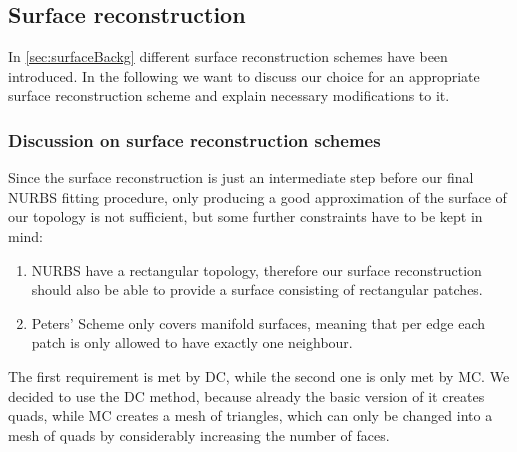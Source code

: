 \subsection{Surface reconstruction}
In \autoref{sec:surfaceBackg} different surface reconstruction schemes have been introduced. In the following we want to discuss our choice for an appropriate surface reconstruction scheme and explain necessary modifications to it.

\subsubsection{Discussion on surface reconstruction schemes}
Since the surface reconstruction is just an intermediate step before our final \ac{NURBS} fitting procedure, only producing a good approximation of the surface of our topology is not sufficient, but some further constraints have to be kept in mind:
\begin{enumerate}
\item \ac{NURBS} have a rectangular topology, therefore our surface reconstruction should also be able to provide a surface consisting of rectangular patches.
\item Peters' Scheme only covers manifold surfaces, meaning that per edge each patch is only allowed to have exactly one neighbour.
\end{enumerate}
The first requirement is met by \ac{DC}, while the second one is only met by \ac{MC}. We decided to use the \ac{DC} method, because already the basic version of it creates \acp{quad}, while \ac{MC} creates a mesh of triangles, which can only be changed into a mesh of \acp{quad} by considerably increasing the number of faces.

